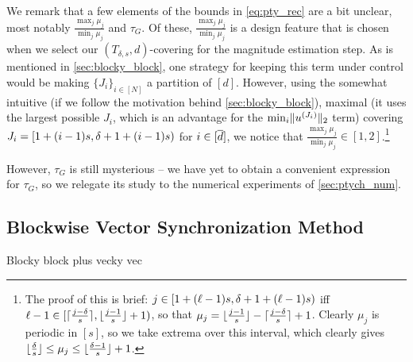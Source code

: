 We remark that a few elements of the bounds in \eqref{eq:pty_rec} are a bit unclear, most notably $\frac{\max_j \mu_j}{\min_j \mu_j}$ and $\tau_G$.  Of these, $\frac{\max_j \mu_j}{\min_j \mu_j}$ is a design feature that is chosen when we select our $(T_{\delta, s}, d)$-covering for the magnitude estimation step.  As is mentioned in \cref{sec:blocky_block}, one strategy for keeping this term under control would be making $\{J_i\}_{i \in [N]}$ a partition of $[d]$.  However, using the somewhat intuitive (if we follow the motivation behind \cref{sec:blocky_block}), maximal (it uses the largest possible $J_i$, which is an advantage for the $\min_i \lVert u^{(J_i)}\rVert_2$ term) covering $J_i = [1 + (i - 1)s, \delta + 1 + (i - 1)s)$ for $i \in [\overline{d}]$, we notice that $\frac{\max_j \mu_j}{\min_j \mu_j} \in [1, 2]$.\footnote{The proof of this is brief: $j \in [1 + (\ell - 1) s, \delta + 1 + (\ell - 1)s)$ iff $\ell - 1 \in [\lceil\frac{j- \delta}{s}\rceil, \lfloor\frac{j - 1}{s}\rfloor + 1)$, so that $\mu_j = \lfloor\frac{j - 1}{s}\rfloor - \lceil\frac{j - \delta}{s}\rceil + 1$.  Clearly $\mu_j$ is periodic in $[s]$, so we take extrema over this interval, which clearly gives $\lfloor\frac{\delta}{s}\rfloor \le \mu_j \le \lfloor\frac{\delta - 1}{s}\rfloor + 1$.}

However, $\tau_G$ is still mysterious -- we have yet to obtain a convenient expression for $\tau_G$, so we relegate its study to the numerical experiments of \cref{sec:ptych_num}.

\subsection{Blockwise Vector Synchronization Method}
\label{sec:pty_vec_sync}
Blocky block plus vecky vec
